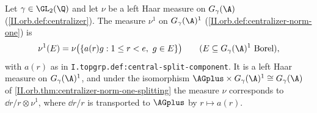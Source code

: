 Let $\gamma\in\GL_2(\Q)$ and let $\nu$ be a left Haar measure on $G_\gamma(\A)$ (\cref{II.orb.def:centralizer}). The measure $\nu^1$ on
$G_\gamma(\A)^1$ (\cref{II.orb.def:centralizer-norm-one}) is
\[
  \nu^1(E)=\nu\bigl(\{a(r)g:1\le r<e,\ g\in E\}\bigr)\qquad(E\subseteq G_\gamma(\A)^1\text{ Borel}),
\]
with $a(r)$ as in \texttt{I.topgrp.def:central-split-component}. It is a left Haar measure on $G_\gamma(\A)^1$, and under the isomorphism
$\AGplus\times G_\gamma(\A)^1\cong G_\gamma(\A)$ of \cref{II.orb.thm:centralizer-norm-one-splitting} the measure $\nu$ corresponds to $\dd r/r\otimes\nu^1$,
where $\dd r/r$ is transported to $\AGplus$ by $r\mapsto a(r)$.
